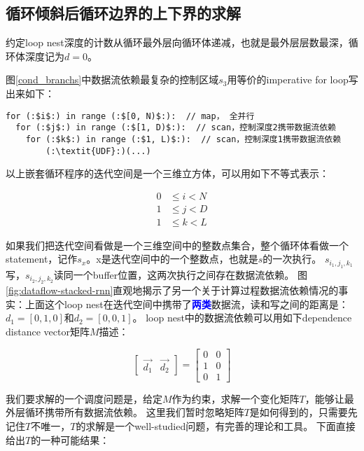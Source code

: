 \subsection{循环倾斜后循环边界的上下界的求解}

约定loop nest深度的计数从循环最外层向循环体递减，也就是最外层层数最深，循环体深度记为$d = 0$。

图\ref{cond_branchs}中数据流依赖最复杂的控制区域$s_3$用等价的imperative for loop写出来如下：
\begin{lstlisting}[language=cplus]
for (:$i$:) in range (:$[0, N)$:):  // map， 全并行
  for (:$j$:) in range (:$[1, D)$:):  // scan，控制深度2携带数据流依赖
    for (:$k$:) in range (:$1, L)$:):  // scan，控制深度1携带数据流依赖
        (:\textit{UDF}:)(...)
\end{lstlisting}

以上嵌套循环程序的迭代空间是一个三维立方体，可以用如下不等式表示：

\begin{equation}
\begin{aligned}
0 &\le i < N \\
1 &\le j < D \\
1 &\le k < L
\end{aligned}\label{eq:bounds}
\end{equation}

如果我们把迭代空间看做是一个三维空间中的整数点集合，整个循环体看做一个statement，记作$s_x$。x是迭代空间中的一个整数点，也就是$s$的一次执行。
$s_{i_1, j_1, k_1}$写，$s_{i_2, j_2, k_2}$读同一个buffer位置，这两次执行之间存在数据流依赖。
图\ref{fig:dataflow-stacked-rnn}直观地揭示了另一个关于计算过程数据流依赖情况的事实：上面这个loop nest在迭代空间中携带了\textbf{\textcolor{blue}{两类}}数据流，读和写之间的距离是：
$d_1 = [0, 1, 0]$和$d_2 = [0, 0, 1]$。
loop nest中的数据流依赖可以用如下dependence distance vector矩阵$M$描述：

\begin{equation*}
    \begin{bmatrix}
        \vec{d_1} & \vec{d_2}
    \end{bmatrix} = 
    \begin{bmatrix}
        0 & 0 \\ 1 & 0 \\ 0 & 1
    \end{bmatrix}
\end{equation*}

我们要求解的一个调度问题是，给定$M$作为约束，求解一个变化矩阵$T$，能够让最外层循环携带所有数据流依赖。
这里我们暂时忽略矩阵$T$是如何得到的，只需要先记住$T$不唯一，$T$的求解是一个well-studied问题，有完善的理论和工具。
下面直接给出$T$的一种可能结果：

